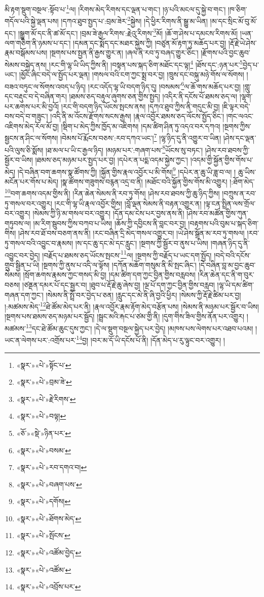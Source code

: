 མི་རྟག་སྡུག་བསྔལ་:སྟོབ་པ་\footnote{«སྣར་»«པེ་»སྟོང་པ་}ལ། །རིགས་མེད་རིགས་དང་ལྡན་པ་གང་། །ཉ་པའི་མངལ་དུ་སྐྱེ་བ་གང་། །ཁ་ཅིག་གདོལ་པའི་སྐྱེ་ལྡན་པས། །དཀའ་ཐུབ་སྤྱད་པ་:བྲམ་ཟེར་\footnote{«སྣར་»«པེ་»བྲམ་ཟེ་}སྐྱེས། །དེ་ཕྱིར་རིགས་ནི་སྒྱུ་མ་ཡིན། །མ་དང་སྲིང་མོ་བུ་མོ་དང་། །སྒྱུག་མོ་དང་ནི་ཚ་མོ་དང་། །བྲམ་ཟེ་རྒྱལ་རིགས་:རྗེའུ་རིགས་\footnote{«སྣར་»«པེ་»རྗེ་རིགས་}མོ། །ཆོ་ག་ཤེས་པ་དམངས་རིགས་མོ། །ཡན་ལག་གཅིག་ནི་ཉམས་པ་དང་། །དམན་དང་སྨོད་དང་མཐར་སྐྱེས་ཀྱི། །བཙུན་མོ་རྟག་ཏུ་མཆོད་པར་བྱ། །རྡོ་རྗེ་ཡེ་ཤེས་རྣམ་བསྒོམས་པས། །སྔགས་པས་སྤྱན་ནི་རྒྱས་གྱུར་ན། །ཞལ་ནི་རབ་ཏུ་བཞད་གྱུར་ཅིང་། །རྫོགས་པའི་བྱང་ཆུབ་སེམས་བསྐྱེད་ནས། །རང་གི་ལྷ་ཡི་ཡིད་ཀྱིས་ནི། །བསྟན་པས་སྐད་ཅིག་མཐོང་དང་ལྟ།\footnote{«སྣར་»«པེ་»བལྟ།} །ཐོས་དང་:ཉན་པར་\footnote{«ཅོ་»«སྡེ་»ཉིན་པར་}བྱེད་པ་ཡང་། །མྱོང་ཞིང་བདེ་ལ་སྤྱོད་པར་ལྡན། །གསལ་བའི་ངག་ཀྱང་སྨྲ་བར་བྱ། །ཁྲུས་དང་བསྐུ་མཉེ་གོས་ལ་སོགས། །བཟའ་བཏུང་ལ་སོགས་འབད་པ་ཉིད། །རང་འདོད་ལྷ་ཡི་བདག་ཉིད་དུ། །བསམས་\footnote{«སྣར་»«པེ་»བསམ་}ལ་ཆོ་གས་མཆོད་པར་བྱ། །གླུ་དང་བརྡུང་བ་དེ་བཞིན་གར། །ཐམས་ཅད་བརྟུལ་ཞུགས་ཅན་གྱིས་སྤྱད། །འདིར་ནི་དངོས་པོ་ཐམས་ཅད་ལ། །ལྷག་པར་ཆགས་པར་མི་བྱའོ། །རང་གི་བདག་ཉིད་ཡོངས་སྤངས་ནས། །དཀའ་ཐུབ་ཀྱིས་ནི་གདུང་མི་བྱ། །ཇི་ལྟར་བདེ་བས་བདེ་བ་གཟུང་། །འདི་ནི་མ་འོངས་རྫོགས་སངས་རྒྱས། །རྣལ་འབྱོར་ཐམས་ཅད་ལོངས་སྤྱོད་ཅིང་། །གང་ལའང་འཇིགས་མེད་རོལ་མོ་བྱ། །སྡིག་པ་མེད་ཀྱིས་ཁྱོད་མ་འཇིགས། །དམ་ཚིག་ཤིན་ཏུ་འདའ་བར་དཀའ། །སྔགས་ཀྱིས་སྦྱངས་ན་ཤིང་ལ་སོགས། །བེམས་པོ་རྨོངས་བཅས་:རབ་དཀའ་ཡང་།\footnote{«སྣར་»«པེ་»རབ་དགའ་བ།} །ལྷ་ཉིད་དུ་ནི་འགྱུར་བ་ཡིན། །ཤེས་དང་ལྡན་པའི་ལུས་ཅི་སྨོས། །ཐ་མལ་པ་ཡི་ང་རྒྱལ་ཉིད། །མཉམ་པར་:གཞག་པས་\footnote{«སྣར་»«པེ་»བཞག་པས་}ཡོངས་སུ་བཏང་། །ཤེས་རབ་ཐབས་ཀྱི་སྦྱོར་བ་ཡིས། །ཐམས་ཅད་མཉམ་པར་སྤྱད་པར་བྱ། །དཔེར་ན་པདྨ་འདམ་སྐྱེས་ཀྱང་། །འདམ་གྱི་སྐྱོན་གྱིས་གོས་པ་མེད། །དེ་བཞིན་བག་ཆགས་སྣ་ཚོགས་ཀྱི། །སྐྱོན་གྱིས་རྣལ་འབྱོར་པ་མི་གོས།\footnote{«སྣར་»«པེ་»དགོས།} །དཔེར་ན་ཆུ་ཡི་ཟླ་བ་ལ། །
ཆུ་ཡིས་མངོན་པར་གོས་པ་མེད། །སྣ་ཚོགས་གཟུགས་བརྙན་འདྲ་བ་ནི། །མཐོང་བའི་སྐྱོན་གྱིས་གོས་མི་འགྱུར། །:ཐོག་མེད་\footnote{«སྣར་»«པེ་»ཐོགས་མེད་}བག་ཆགས་འདམ་གྱིས་ནི། །རིན་ཆེན་སེམས་ནི་རབ་ཏུ་གོས། །ཤེས་རབ་ཐབས་ཀྱི་ཆུ་ཉིད་ཀྱིས། །བཀྲུས་ན་རབ་ཏུ་གསལ་བར་འགྱུར། །རང་གི་ལྷ་ཡི་རྣལ་འབྱོར་གྱིས། །བློ་ལྡན་སེམས་ནི་བརྟན་འགྱུར་ན། །ལྟ་ངན་སྤྲིན་ལས་གྲོལ་བར་འགྱུར། །སེམས་ཀྱི་ཉི་མ་གསལ་བར་འགྱུར། །དོན་དམ་ངེས་པར་བྱས་ནས་ནི། །ཤེས་རབ་མཚོན་གྱིས་ཀུན་གཏུབས་ལ། །མ་རིག་སྦུབས་ཀྱིས་བཀབ་པ་ཡིས། །ཆོས་ཀྱི་དབྱིངས་ནི་བླང་བར་བྱ། །བརྟགས་པའི་བུམ་པ་སྐད་ཅིག་གིས། །ཤེས་རབ་ཐོ་བས་བཅག་ནས་ནི། །རང་བཞིན་དྲི་མེད་གསལ་འགྱུར་བ། །ཡེ་ཤེས་སྒྲོན་མ་རབ་ཏུ་གསལ། །རབ་ཏུ་གསལ་བའི་འབྱུང་བ་རྣམས། །ས་དང་ཆུ་དང་མེ་དང་རླུང་། །སྔགས་ཀྱི་སྦྱོར་བ་ནུས་པ་ཡིས། །གཞན་ཉིད་དུ་ནི་འབྱུང་བར་བྱེད། །བརྗོད་པ་ཐམས་ཅད་ཡོངས་སྤངས་\footnote{«སྣར་»«པེ་»སྤོངས་}ལ། །སྔགས་ཀྱི་བརྗོད་པ་ཡང་དག་སྤྱོད། །བདེ་བའི་དངོས་གྲུབ་སྦྱིན་པ་ཡི། །སྔགས་ཀྱི་ནུས་པ་འདི་ལ་ལྟོས། །དཀོན་མཆོག་གསུམ་ནི་མི་སྤང་ཞིང་། །དེ་བཞིན་བླ་མ་བྱང་ཆུབ་སེམས། །སྲོག་ཆགས་རྣམས་ཀྱང་གསད་མི་བྱ། །དམ་ཚིག་དག་ཀྱང་བྱིན་གྱིས་བརླབས། །རིན་ཆེན་དང་ནི་ག་བུར་བཅས། །ཙནྡན་དམར་པོ་དང་སྦྱར་བ། །ཐུབ་པ་རྡོ་རྗེ་ཆུ་ཞེས་བྱ། །ལྔ་པོ་དག་ཀྱང་བྱིན་གྱིས་བརླབ། །ལྷ་ཡི་དམ་ཚིག་གཞན་དག་ཀྱང་། །སེམས་ནི་སྤྲོ་བར་བྱེད་པ་ཅན། །རླུང་དང་མེ་ནི་ཞི་བྱའི་ཕྱིར། །སེམས་ཀྱི་རྡོ་རྗེ་ཚིམ་པར་བྱ། །:མཚམས་མེད་\footnote{«སྣར་»«པེ་»འཚོམ་བྱེད་}ཐེ་ཚོམ་མེད་པར་ནི། །རྣལ་འབྱོར་རྣམ་རྟོག་མེད་བརྩོན་པས། །སེམས་ནི་མཉམ་པར་སྦྱོར་བ་ཡིས། །སྔགས་པས་ཐམས་ཅད་མཉམ་པར་སྦྱོད། །སྦྲང་མའི་རྐང་པ་ཙམ་གྱི་ནི། །དུག་གིས་ཟིལ་གྱིས་ནོན་པར་འགྱུར། །མཚམས་\footnote{«སྣར་»«པེ་»འཚོམ་}དང་ཐེ་ཚོམ་ཆུང་དུས་ཀྱང་། །དེ་ལ་སྡུག་བསྔལ་སྐྱེད་པར་བྱེད། །མཁས་པས་ལེགས་པར་འཐབ་པའམ། །ཡང་ན་ལེགས་པར་:འགྲོས་པར་\footnote{«སྣར་»«པེ་»འབྲོས་པར་}བྱ། །བར་མ་དོ་ཡི་དངོས་པོ་ནི། །དོན་མེད་པ་རུ་ལྟུང་བར་འགྱུར། །
